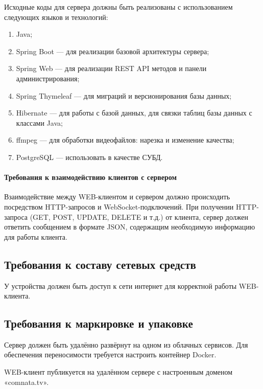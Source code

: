 Исходные коды для сервера должны быть реализованы с использованием следующих языков и технологий:
\begin{enumerate}[noitemsep]
    \item Java;
    \item Spring Boot — для реализации базовой архитектуры сервера;
    \item Spring Web — для реализации REST API методов и панели администрирования;
    \item Spring Thymeleaf — для миграций и версионирования базы данных;
    \item Hibernate — для работы с базой данных, для связки таблиц базы данных с классами Java;
    \item ffmpeg — для обработки видеофайлов: нарезка и изменение качества;
    \item PostgreSQL — использовать в качестве СУБД.
\end{enumerate}

\paragraph{Требования к взаимодействию клиентов с сервером}
Взаимодействие между WEB-клиентом и сервером должно происходить посредством HTTP-запросов и WebSocket-подключений.
При получении HTTP-запроса (GET, POST, UPDATE, DELETE и т.д.) от клиента, сервер должен ответить сообщением в формате
JSON, содержащим необходимую информацию для работы клиента.

\subsection{Требования к составу сетевых средств}

У устройства должен быть доступ к сети интернет для корректной работы WEB-клиента.

\subsection{Требования к маркировке и упаковке}

Сервер должен быть удалённо развёрнут на одном из облачных сервисов.
Для обеспечения переносимости требуется настроить контейнер Docker.

WEB-клиент публикуется на удалённом сервере с настроенным доменом «comnata.tv».